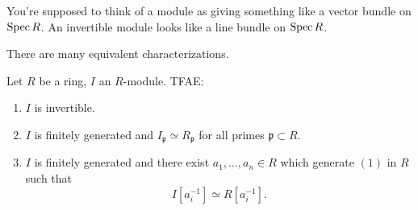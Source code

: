 \begin{remark} 
You're supposed to think of a module as giving something like a vector bundle
on $\operatorname{Spec} R$. An invertible module looks like a line bundle on $\operatorname{Spec} R$.
\end{remark} 

There are many equivalent characterizations.

\begin{proposition} 
Let $R$ be a ring, $I$ an $R$-module. TFAE:
\begin{enumerate}
\item $I$ is invertible.   
\item $I$ is finitely generated and $I_{\mathfrak{p}} \simeq R_{\mathfrak{p}}$ for all primes
$\mathfrak{p} \subset R$.
\item $I$ is finitely generated and there exist $a_1, \dots, a_n \in R$ which generate $(1)$
in $R$ such that
\[ I[a_i^{-1}]\simeq R[a_i^{-1}].  \]
\end{enumerate}
\end{proposition} 
